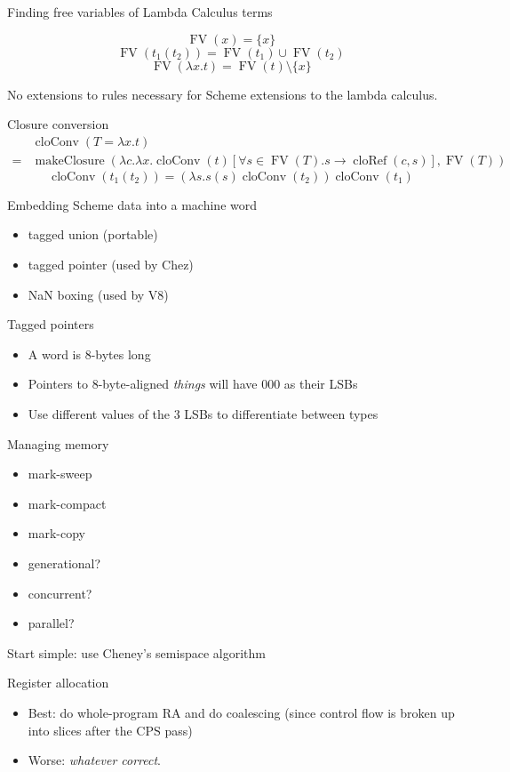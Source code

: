 \documentclass{beamer}
\begin{document}
\newcommand{\FV}{\operatorname{FV}}
\begin{frame}{Finding free variables of Lambda Calculus terms}
  \begin{theorem}
    \[\FV(x)=\{x\}\]
    \[\FV(t_1(t_2))=\FV(t_1)\cup\FV(t_2)\]
    \[\FV(\lambda x.t)=\FV(t)\setminus\{x\}\]
  \end{theorem}

  No extensions to rules necessary for Scheme extensions to the lambda calculus.
\end{frame}

\newcommand{\cloConv}{\operatorname{cloConv}}
\newcommand{\makeClosure}{\operatorname{makeClosure}}
\begin{frame}{Closure conversion}
  \[
    \begin{aligned}
      &\cloConv(T=\lambda x.t)\\
      =&\makeClosure(\lambda c.\lambda x.\cloConv(t)[\forall s\in\FV(T).s\to\operatorname{cloRef}(c, s)], \FV(T))
    \end{aligned}
  \]
  \[
    \cloConv(t_1(t_2))=(\lambda s. s (s) \cloConv(t_2))\cloConv(t_1)
  \]
\end{frame}

\begin{frame}{Embedding Scheme data into a machine word}
  \begin{itemize}
  \item tagged union (portable)
  \item tagged pointer (used by Chez)
  \item NaN boxing (used by V8)
  \end{itemize}
\end{frame}

\begin{frame}{Tagged pointers}
  \begin{itemize}
  \item A word is 8-bytes long
  \item Pointers to 8-byte-aligned \textit{things} will have 000 as their LSBs
  \item Use different values of the 3 LSBs to differentiate between types
  \end{itemize}
\end{frame}

\begin{frame}{Managing memory}
  \begin{itemize}
  \item mark-sweep
  \item mark-compact
  \item mark-copy
  \item generational?
  \item concurrent?
  \item parallel?
  \end{itemize}

  Start simple: use Cheney's semispace algorithm
\end{frame}

\begin{frame}{Register allocation}
  \begin{itemize}
  \item Best: do whole-program RA and do coalescing (since control flow is broken up into slices after the CPS pass)
  \item Worse: \textit{whatever correct}.
  \end{itemize}
\end{frame}
\end{document}
